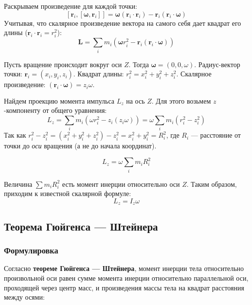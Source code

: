 Раскрываем произведение для каждой точки:
\[
[\mathbf{r}_i, [\boldsymbol{\omega}, \mathbf{r}_i]] = \boldsymbol{\omega}(\mathbf{r}_i \cdot \mathbf{r}_i) - \mathbf{r}_i(\mathbf{r}_i \cdot \boldsymbol{\omega})
\]
Учитывая, что скалярное произведение вектора на самого себя дает квадрат его длины ($\mathbf{r}_i \cdot \mathbf{r}_i = r_i^2$):
\[
\mathbf{L} = \sum_i m_i \left( \boldsymbol{\omega} r_i^2 - \mathbf{r}_i (\mathbf{r}_i \cdot \boldsymbol{\omega}) \right)
\]

Пусть вращение происходит вокруг оси $Z$. Тогда $\boldsymbol{\omega} = (0, 0, \omega)$.
Радиус-вектор точки: $\mathbf{r}_i = (x_i, y_i, z_i)$.
Квадрат длины: $r_i^2 = x_i^2 + y_i^2 + z_i^2$.
Скалярное произведение: $(\mathbf{r}_i \cdot \boldsymbol{\omega}) = z_i \omega$.

Найдем проекцию момента импульса $L_z$ на ось $Z$. Для этого возьмем $z$-компоненту от общего уравнения:
\[
L_z = \sum_i m_i ( \omega r_i^2 - z_i (z_i \omega) ) = \omega \sum_i m_i ( r_i^2 - z_i^2 )
\]
Так как $r_i^2 - z_i^2 = (x_i^2 + y_i^2 + z_i^2) - z_i^2 = x_i^2 + y_i^2 = R_i^2$, где $R_i$ --- расстояние от точки до \textit{оси} вращения (а не до начала координат).

\[
L_z = \omega \sum_i m_i R_i^2
\]

Величина $\sum m_i R_i^2$ есть момент инерции относительно оси $Z$.
Таким образом, приходим к известной скалярной формуле:
\[\boxed{
L_z = I_z \omega
}\]

\subsection{Теорема Гюйгенса --- Штейнера}

\subsubsection{Формулировка}

Согласно \textbf{теореме Гюйгенса --- Штейнера}, момент инерции тела относительно произвольной оси равен сумме момента инерции относительно параллельной оси, проходящей через центр масс, и произведения массы тела на квадрат расстояния между осями:

